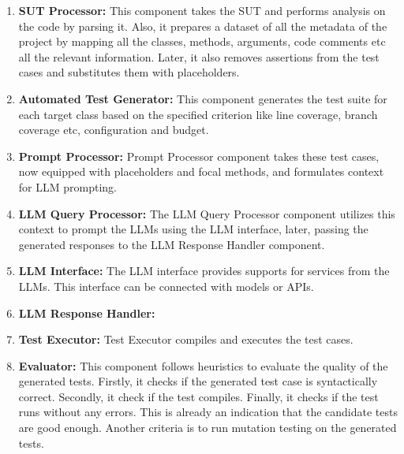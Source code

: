 \begin{enumerate}
    \item \textbf{SUT Processor:} This component takes the SUT and performs analysis on the code by parsing it. Also, it prepares a dataset of all the metadata of the project by mapping all the classes, methods, arguments, code comments etc all the relevant information. Later, it also removes assertions from the test cases and substitutes them with placeholders. 
    
    \item \textbf{Automated Test Generator:} This component generates the test suite for each target class based on the specified criterion like line coverage, branch coverage etc, configuration and budget.
    
    \item \textbf{Prompt Processor:} Prompt Processor component takes these test cases, now equipped with placeholders and focal methods, and formulates context for LLM prompting.
    
    \item \textbf{LLM Query Processor:} The LLM Query Processor component utilizes this context to prompt the LLMs using the LLM interface, later, passing the generated responses to the LLM Response Handler component.
    
    \item \textbf{LLM Interface:} The LLM interface provides supports for services from the LLMs. This interface can be connected with models or APIs.
    
    \item \textbf{LLM Response Handler:}
    
    \item \textbf{Test Executor:} Test Executor compiles and executes the test cases.
    
    \item \textbf{Evaluator:} This component follows heuristics to evaluate the quality of the generated tests. Firstly, it checks if the generated test case is syntactically correct. Secondly, it check if the test compiles. Finally, it checks if the test runs without any errors. This is already an indication that the candidate tests are good enough. Another criteria is to run mutation testing on the generated tests.
\end{enumerate}


